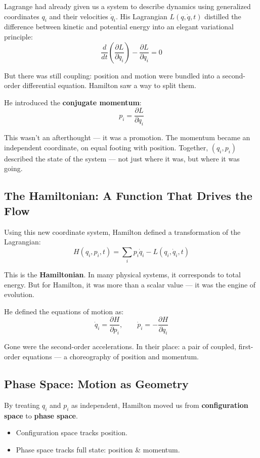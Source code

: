 Lagrange had already given us a system to describe dynamics using generalized coordinates \( q_i \) and their velocities \( \dot{q}_i \). His Lagrangian \( L(q, \dot{q}, t) \) distilled the difference between kinetic and potential energy into an elegant variational principle:
\[
\frac{d}{dt} \left( \frac{\partial L}{\partial \dot{q}_i} \right) - \frac{\partial L}{\partial q_i} = 0
\]

But there was still coupling: position and motion were bundled into a second-order differential equation. Hamilton saw a way to split them.

He introduced the \textbf{conjugate momentum}:
\[
p_i = \frac{\partial L}{\partial \dot{q}_i}
\]

This wasn’t an afterthought — it was a promotion. The momentum became an independent coordinate, on equal footing with position.  
Together, \( (q_i, p_i) \) described the state of the system — not just where it was, but where it was going.

\subsection{The Hamiltonian: A Function That Drives the Flow}

Using this new coordinate system, Hamilton defined a transformation of the Lagrangian:
\[
H(q_i, p_i, t) = \sum_i p_i \dot{q}_i - L(q_i, \dot{q}_i, t)
\]

This is the \textbf{Hamiltonian}. In many physical systems, it corresponds to total energy.  
But for Hamilton, it was more than a scalar value — it was the engine of evolution.

He defined the equations of motion as:
\[
\dot{q}_i = \frac{\partial H}{\partial p_i}, \qquad \dot{p}_i = -\frac{\partial H}{\partial q_i}
\]

Gone were the second-order accelerations.  
In their place: a pair of coupled, first-order equations — a choreography of position and momentum.

\subsection{Phase Space: Motion as Geometry}

By treating \( q_i \) and \( p_i \) as independent, Hamilton moved us from \textbf{configuration space} to \textbf{phase space}.

\begin{itemize}
    \item Configuration space tracks position.
    \item Phase space tracks full state: position \& momentum.
\end{itemize}

